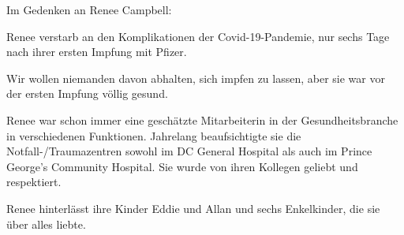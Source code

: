 Im Gedenken an Renee Campbell:

Renee verstarb an den Komplikationen der Covid-19-Pandemie, nur sechs Tage nach
ihrer ersten Impfung mit Pfizer.

Wir wollen niemanden davon abhalten, sich impfen zu lassen, aber sie war vor der
ersten Impfung völlig gesund.

Renee war schon immer eine geschätzte Mitarbeiterin in der Gesundheitsbranche in
verschiedenen Funktionen. Jahrelang beaufsichtigte sie die
Notfall-/Traumazentren sowohl im DC General Hospital als auch im Prince George's
Community Hospital.  Sie wurde von ihren Kollegen geliebt und respektiert.

Renee hinterlässt ihre Kinder Eddie und Allan und sechs Enkelkinder, die sie
über alles liebte.
